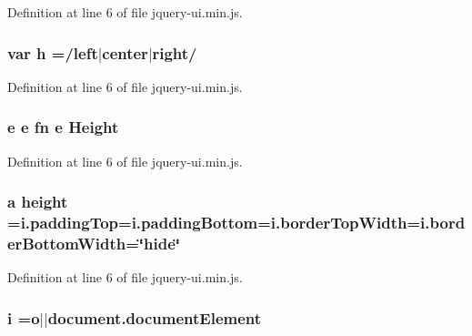 {{Definition at line 6 of file jquery-\/ui.\+min.\+js.

\subsubsection[{\texorpdfstring{h}{h}}]{\setlength{\rightskip}{0pt plus 5cm}var h =/left$\vert$center$\vert$right/}\hypertarget{jquery-ui_8min_8js_a79fe0eb780a2a4b5543b4dddf8b6188a}{}\label{jquery-ui_8min_8js_a79fe0eb780a2a4b5543b4dddf8b6188a}


Definition at line 6 of file jquery-\/ui.\+min.\+js.

\subsubsection[{\texorpdfstring{Height}{Height}}]{ {\bf e} {\bf e} {\bf fn} {\bf e} Height}\hypertarget{jquery-ui_8min_8js_a1a6d2f0a7302d6ffa1db9fa5313e2705}{}\label{jquery-ui_8min_8js_a1a6d2f0a7302d6ffa1db9fa5313e2705}


Definition at line 6 of file jquery-\/ui.\+min.\+js.

\subsubsection[{\texorpdfstring{height}{height}}]{ {\bf a} height =i.\+padding\+Top=i.\+padding\+Bottom=i.\+border\+Top\+Width=i.\+border\+Bottom\+Width=\char`\"{}hide\char`\"{}}\hypertarget{jquery-ui_8min_8js_a7ec7f4e8243c6c20295ecc9a90225d43}{}\label{jquery-ui_8min_8js_a7ec7f4e8243c6c20295ecc9a90225d43}


Definition at line 6 of file jquery-\/ui.\+min.\+js.

\subsubsection[{\texorpdfstring{i}{i}}]{ i ={\bf o}$\vert$$\vert$document.\+document\+Element}\hypertarget{jquery-ui_8min_8js_a83e0f8a79d7f496783fc7527db51773e}{}\label{jquery-ui_8min_8js_a83e0f8a79d7f496783fc7527db51773e}


}}
